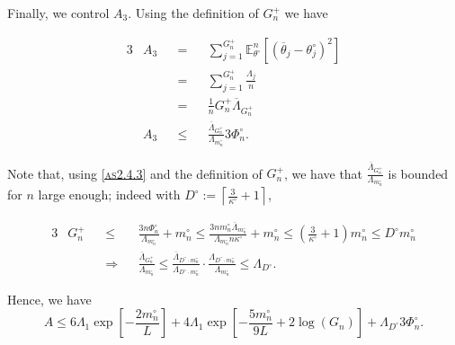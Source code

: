 \medskip

Finally, we control $A_{3}.$
Using the definition of $G_{n}^{+}$ we have

\begin{alignat*}{3}
& A_{3} &&=&& \sum\limits_{j = 1}^{G_{n}^{+}} \mathds{E}_{\theta^{\circ}}^{n}\left[\left(\overline{\theta}_{j} - \theta^{\circ}_{j}\right)^{2}\right]\\
& &&=&& \sum\limits_{j = 1}^{G_{n}^{+}} \frac{\Lambda_{j}}{n}\\
& &&=&& \frac{1}{n} G_{n}^{+} \overline{\Lambda}_{G_{n}^{+}}\\
&A_{3} &&\leq&& \frac{\overline{\Lambda}_{G_{n}^{+}}}{\Lambda_{m_{n}^{\circ}}} 3 \Phi_{n}^{\circ}.
\end{alignat*}

Note that, using \textsc{\cref{as2.4.3}} and the definition of $G_{n}^{+}$, we have that $\frac{\overline{\Lambda}_{G_{n}^{+}}}{\Lambda_{m_{n}^{\circ}}}$ is bounded for $n$ large enough; indeed with $D^{\circ} := \left\lceil \frac{3}{\kappa^{\circ}} + 1\right\rceil$,

\begin{alignat*}{3}
& G_{n}^{+} && \leq && \frac{3 n \Phi_{n}^{\circ}}{\Lambda_{m_{n}^{\circ}}} + m_{n}^{\circ} \leq \frac{3 n m_{n}^{\circ} \overline{\Lambda}_{m_{n}^{\circ}}}{\Lambda_{m_{n}^{\circ}} n \kappa^{\circ}} + m_{n}^{\circ} \leq \left(\frac{3}{\kappa^{\circ}} + 1\right) m_{n}^{\circ} \leq D^{\circ} m_{n}^{\circ}\\ 
& &&\Rightarrow&& \frac{\overline{\Lambda}_{G_{n}^{+}}}{\Lambda_{m_{n}^{\circ}}}\leq \frac{\overline{\Lambda}_{D^{\circ} \cdot m_{n}^{\circ}}}{\Lambda_{D^{\circ} \cdot m_{n}^{\circ}}} \cdot \frac{\Lambda_{D^{\circ} \cdot m_{n}^{\circ}}}{\Lambda_{m_{n}^{\circ}}} \leq \Lambda_{D^{\circ}}.
\end{alignat*}

\medskip

Hence, we have
\[A \leq 6 \Lambda_{1} \exp\left[- \frac{2 m_{n}^{\circ}}{L}\right] + 4 \Lambda_{1} \exp\left[-\frac{5 m_{n}^{\circ}}{9 L} + 2 \log \left(G_{n}\right)\right] +  \Lambda_{D^{\circ}} 3 \Phi_{n}^{\circ}.\]

\bigskip

